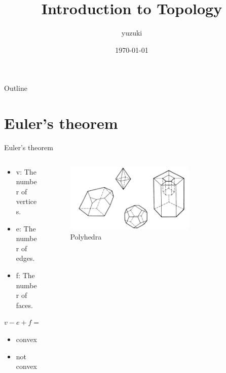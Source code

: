\documentclass{beamer}
\title{Introduction to Topology}
\author{yuzuki}
\institute{Eyes, Japan}
\date{\today}
\begin{document}
\begin{frame}
    \titlepage
\end{frame}

\begin{frame}{Outline}
    \tableofcontents
\end{frame}


\section{Euler's theorem}

\begin{frame}{Euler's theorem}
\begin{columns}
\begin{column}{0.5\textwidth}
  \begin{block}{}
    \begin{itemize}
    \item v: The number of vertices.
    \item e: The number of edges.
    \item f: The number of faces.
    \end{itemize}
  \end{block}
  \begin{block}{}
    $v - e + f = 2$
  \end{block}
  \begin{block}{}
    \begin{itemize}
    \item convex
    \item not convex
    \end{itemize}
  \end{block}
\end{column}
\begin{column}{0.5\textwidth}
    \begin{figure}
    \centering
        \includegraphics[width=0.7\textwidth]{figure_1_1.png}
        \caption{Polyhedra}
    \end{figure}
\end{column}
\end{columns}
\end{frame}
\end{document}
